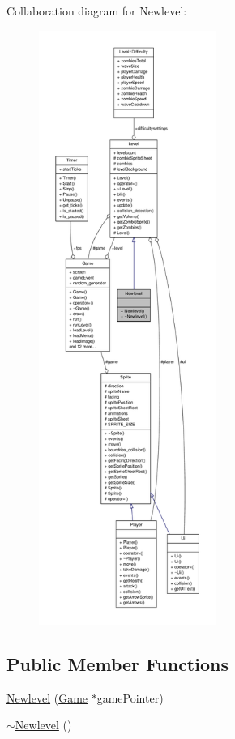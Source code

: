 Collaboration diagram for Newlevel\-:
\nopagebreak
\begin{figure}[H]
\begin{center}
\leavevmode
\includegraphics[height=550pt]{classNewlevel__coll__graph}
\end{center}
\end{figure}
\subsection*{Public Member Functions}
\begin{DoxyCompactItemize}
\item 
\hyperlink{classNewlevel_a677e40755e35f100d2a3ab7890b76a94}{Newlevel} (\hyperlink{classGame}{Game} $\ast$game\-Pointer)
\item 
\hyperlink{classNewlevel_a552bd423d5925e29a0555bde2d1ac7a6}{$\sim$\-Newlevel} ()
\end{DoxyCompactItemize}
